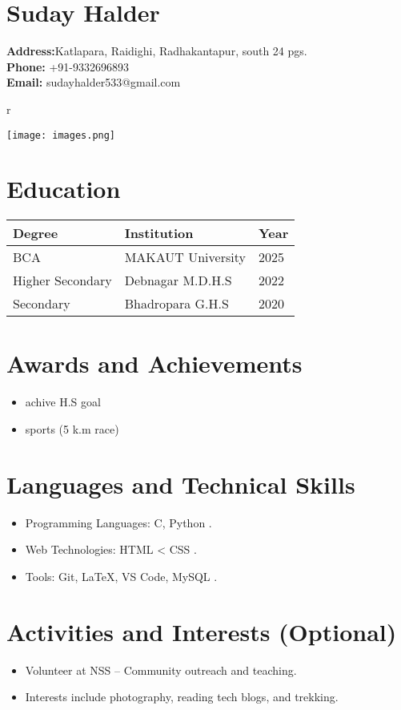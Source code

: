 \documentclass[a4paper,12pt]{article}
\begin{document}
\begin{minipage}[t]{0.7\textwidth}
    \section*{Suday Halder}
    \textbf{Address:}Katlapara, Raidighi, Radhakantapur, south 24 pgs.\\
    \textbf{Phone:} +91-9332696893\\
    \textbf{Email:} sudayhalder533@gmail.com\\
\end{minipage}r
\hfill
\begin{minipage}[t]{0.25\textwidth}
    \texttt{[image: images.png]} %
\end{minipage}

\vspace{1em}

\section*{Education}
\begin{tabular}{|p{4cm}|p{4cm}|p{4cm}|}
\hline
\textbf{Degree} & \textbf{Institution} & \textbf{Year} \\
\hline
BCA & MAKAUT University & 2025 \\
Higher Secondary &Debnagar M.D.H.S & 2022 \\
Secondary & Bhadropara G.H.S & 2020 \\
\hline
\end{tabular}

\section*{Awards and Achievements}
\begin{itemize}
    \item achive H.S goal
    \item sports (5 k.m race)
\end{itemize}

\section*{Languages and Technical Skills}
\begin{itemize}
    \item Programming Languages: C, Python .
    \item  Web Technologies: HTML < CSS .
    \item Tools: Git, LaTeX, VS Code, MySQL .
\end{itemize}

\section*{Activities and Interests (Optional)}
\begin{itemize}
    \item Volunteer at NSS – Community outreach and teaching.
    \item Interests include photography, reading tech blogs, and trekking.
\end{itemize}
\end{document}
